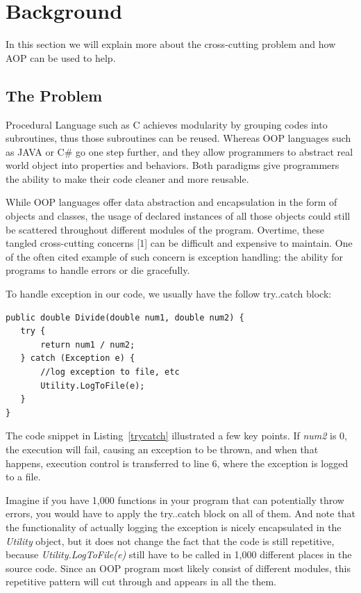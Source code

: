 \section{Background}
In this section we will explain more about the cross-cutting problem and how AOP can be used to help.

\subsection{The Problem}
Procedural Language such as C achieves modularity by grouping codes into subroutines, thus those subroutines can be reused. Whereas OOP languages such as JAVA or C\# go one step further, and they allow programmers to abstract real world object into properties and behaviors. Both paradigms give programmers the ability to make their code cleaner and more reusable.

While OOP languages offer data abstraction and encapsulation in the form of objects and classes, the usage of declared instances of all those objects could still be scattered throughout different modules of the program. Overtime, these tangled cross-cutting concerns [1] can be difficult and expensive to maintain. One of the often cited example of such concern is exception handling: the ability for programs to handle errors or die gracefully.

To handle exception in our code, we usually have the follow try..catch block:

\begin{lstlisting}[caption={try..catch pattern}, label=trycatch]
public double Divide(double num1, double num2) {
   try {
       return num1 / num2;
   } catch (Exception e) {
       //log exception to file, etc
       Utility.LogToFile(e);
   }
}
\end{lstlisting}

The code snippet in Listing~\ref{trycatch} illustrated a few key points. If {\em num2} is 0, the execution will fail, causing an exception to be thrown, and when that happens, execution control is transferred to line 6, where the exception is logged to a file. 

Imagine if you have 1,000 functions in your program that can potentially throw errors, you would have to apply the try..catch block on all of them. And note that the functionality of actually logging the exception is nicely encapsulated in the {\em Utility} object, but it does not change the fact that the code is still repetitive, because {\em Utility.LogToFile(e)} still have to be called in 1,000 different places in the source code. Since an OOP program most likely consist of different modules, this repetitive pattern will cut through and appears in all the them.

